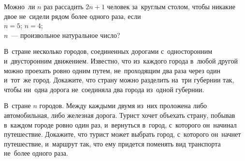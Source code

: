 \begin{problems}
\item
Можно~ли $n$ раз рассадить $2 n + 1$ человек за~круглым столом, чтобы никакие
двое не~сидели рядом более одного раза, если
\\
\subproblem $n = 5$;
\quad
\subproblem $n = 4$;
\\
\subproblem $n$~--- произвольное натуральное число?

\item
В~стране несколько городов, соединенных дорогами с~односторонним и~двусторонним
движением.
Известно, что из~каждого города в~любой другой можно проехать ровно одним
путем, не~проходящим два раза через один и~тот~же город.
Докажите, что страну можно разделить на~три губернии так, чтобы ни~одна дорога
не~соединяла два города из~одной губернии.

\item
В~стране $n$ городов.
Между каждыми двумя из~них проложена либо автомобильная, либо железная дорога.
Турист хочет объехать страну, побывав в~каждом городе ровно один раз,
и~вернуться в~город, с~которого он~начинал путешествие.
Докажите, что турист может выбрать город, с~которого он~начнет путешествие,
и~маршрут так, что ему придется поменять вид транспорта не~более одного раза.

\end{problems}

